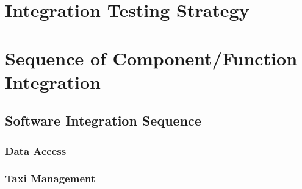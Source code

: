 \section{Integration Testing Strategy}
\section{Sequence of Component/Function Integration}
\subsection{Software Integration Sequence}
\subsubsection*{Data Access}
\begin{figure}[H]
\centering
{}
\end{figure}
\subsubsection*{Taxi Management}


